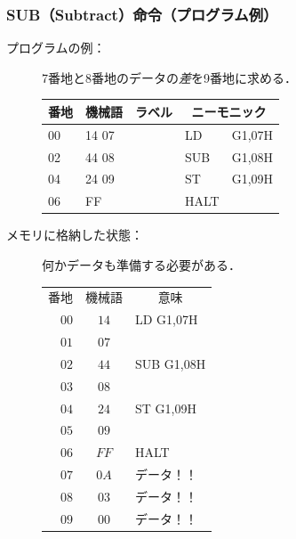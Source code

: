 \documentclass[handout]{beamer}        %
\begin{document}
\begin{frame}
  \frametitle{SUB（Subtract）命令（プログラム例）}
  \begin{description}
  \item[プログラムの例：]7番地と8番地のデータの\emph{差}を9番地に求める．\\
    {\ttfamily\small\begin{center}
      \begin{tabular}{|l|l|l|l l|} \hline
        番地 & 機械語 & ラベル & \multicolumn{2}{|c|}{ニーモニック} \\
        \hline
        00 & 14 07 & & LD   & G1,07H \\
        02 & 44 08 & & SUB  & G1,08H \\
        04 & 24 09 & & ST   & G1,09H \\
        06 & FF    & & HALT & \\
        \hline
      \end{tabular}
    \end{center}}
    \vfill

    \item[メモリに格納した状態：] 何かデータも準備する必要がある．
      {\ttfamily\small\begin{center}
        \begin{tabular}{r|c|l}
          \multicolumn{1}{c}{番地} &
          \multicolumn{1}{c}{機械語} &
          \multicolumn{1}{c}{意味} \\
          \cline{2-2}
          $00$ & $14$ & LD G1,07H \\
          \cline{2-2}
          $01$ & $07$ &           \\
          \cline{2-2}
          $02$ & $44$ & SUB G1,08H \\
          \cline{2-2}
          $03$ & $08$ &           \\
          \cline{2-2}
          $04$ & $24$ & ST G1,09H \\
          \cline{2-2}
          $05$ & $09$ &           \\
          \cline{2-2}
          $06$ & $FF$ & HALT      \\
          \cline{2-2}
          $07$ & $0A$ & データ！！\\
          \cline{2-2}
          $08$ & $03$ & データ！！\\
          \cline{2-2}
          $09$ & $00$ & データ！！\\
          \cline{2-2}
        \end{tabular}
      \end{center}}
      \vfill

  \end{description}
\end{frame}
\end{document}
